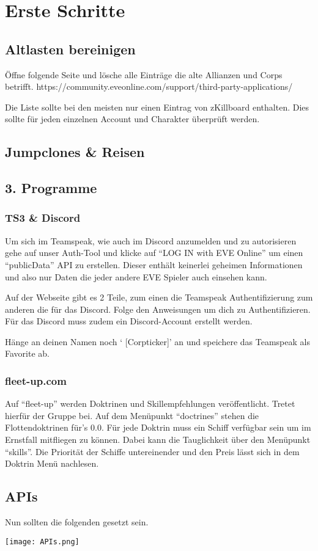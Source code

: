 \section{Erste Schritte}
\subsection{Altlasten bereinigen}
Öffne folgende Seite und lösche alle Einträge die alte Allianzen und Corps betrifft. https://community.eveonline.com/support/third-party-applications/

Die Liste sollte bei den meisten nur einen Eintrag von zKillboard enthalten.
Dies sollte für jeden einzelnen Account und Charakter überprüft werden.

\subsection{Jumpclones \& Reisen}

\subsection{3. Programme}

\subsubsection{TS3 \& Discord}

Um sich im Teamspeak, wie auch im Discord anzumelden und zu autorisieren gehe auf unser Auth-Tool und klicke auf “LOG IN with EVE Online” um einen “publicData” API zu erstellen. Dieser enthält keinerlei geheimen Informationen und also nur Daten die jeder andere EVE Spieler auch einsehen kann.

Auf der Webseite gibt es 2 Teile, zum einen die Teamspeak Authentifizierung zum anderen die für das Discord. Folge den Anweisungen um dich zu Authentifizieren. Für das Discord muss zudem ein Discord-Account erstellt werden.

Hänge an deinen Namen noch ‘ [Corpticker]’ an und speichere das Teamspeak als Favorite ab.


\subsubsection{fleet-up.com}

Auf “fleet-up” werden Doktrinen und Skillempfehlungen veröffentlicht. Tretet hierfür der Gruppe bei.
Auf dem Menüpunkt “doctrines” stehen die Flottendoktrinen für’s 0.0. Für jede Doktrin muss ein Schiff verfügbar sein um im Ernstfall mitfliegen zu können. Dabei kann die Tauglichkeit über den Menüpunkt “skills”. Die  Priorität der Schiffe untereinender und den Preis lässt sich in dem Doktrin Menü nachlesen.


\subsection{APIs}

Nun sollten die folgenden \API[APIs] gesetzt sein.

\texttt{[image: APIs.png]}